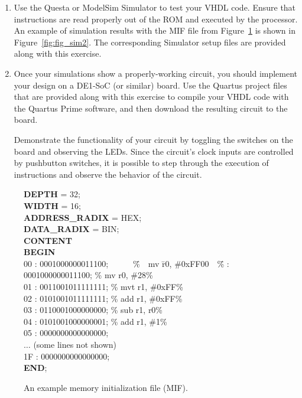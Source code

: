 \documentclass[epsfig,10pt,fullpage]{article} \addtolength{\textwidth}{1.5in}
\begin{document}
\begin{enumerate}
\item Use the Questa or ModelSim Simulator to test your VHDL code. Ensure 
that instructions are read properly out of the ROM and executed by the processor. An example 
of simulation results with the MIF file from 
Figure~\ref{fig:fig_MIF} is shown in Figure~\ref{fig:fig_sim2}. The corresponding Simulator 
setup files are provided along with this exercise.
\item Once your simulations show a properly-working circuit, you should implement
your design on a DE1-SoC (or similar) board. Use the Quartus project files that are 
provided along with this exercise to compile your VHDL code with the Quartus Prime 
software, and then download the resulting circuit to the board.

Demonstrate the functionality of your circuit by
toggling the switches on the board and observing the LEDs. Since the circuit's clock inputs 
are controlled by pushbutton switches, it is possible to step through the execution of 
instructions and observe the behavior of the circuit.
\end{enumerate}

\begin{figure}[H]
\begin{center}
\begin{minipage}[t]{12.5 cm}
\begin{tabbing}
{\bf DEPTH} = 32;\\
{\bf WIDTH} = 16;\\
{\bf ADDRESS\_RADIX} = HEX;\\
{\bf DATA\_RADIX} = BIN;\\
{\bf CONTENT}\\
{\bf BEGIN}\\
00	:	0001000000011100;~~~~~~\=\%~~mv  \=r0, \#0xFF00~~\=\% 	:	0001000000011100;	\>\% mv \>r0, \#28\>\%\\
01	:	0011001011111111; \>\% mvt \>r1, \#0xFF\>\%\\
02	:	0101001011111111;	\>\% add  \>r1, \#0xFF\>\%\\
03	:	0110001000000000;	\>\% sub  \>r1, r0\>\%\\
04	:	0101001000000001;	\>\% add  \>r1, \#1\>\%\\
05	:	0000000000000000;\\
$\ldots$ (some lines not shown)\\
1F :	0000000000000000;\\
{\bf END};
\end{tabbing}
\end{minipage}
\end{center}
\caption{An example memory initialization file (MIF).}
\label{fig:fig_MIF}
\end{figure}
\end{document}
